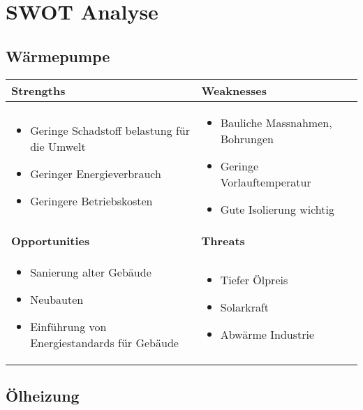 \chapter{SWOT Analyse}
\label{chap:swot}

\section{Wärmepumpe}

\begin{tabular}[c]{|p{}|p{}|}
  \hline
  \textbf{\Large{Strengths}} &
  \textbf{\Large{Weaknesses}} \\ \hline
  
  \begin{itemize}
    \item Geringe Schadstoff belastung für die Umwelt
    \item Geringer Energieverbrauch
    \item Geringere Betriebskosten
  \end{itemize}
  &
  
  \begin{itemize}
    \item Bauliche Massnahmen, Bohrungen
    \item Geringe Vorlauftemperatur
    \item Gute Isolierung wichtig
  \end{itemize}
  \\ \hline
  
  \textbf{\Large{Opportunities}} &
  \textbf{\Large{Threats}} \\ \hline
  
  \begin{itemize}
    \item Sanierung alter Gebäude
    \item Neubauten
    \item Einführung von Energiestandards für Gebäude
  \end{itemize}
  &
  
  \begin{itemize}
    \item Tiefer Ölpreis
    \item Solarkraft
    \item Abwärme Industrie
  \end{itemize}  
  \\ \hline
\end{tabular}

\section{Ölheizung}

